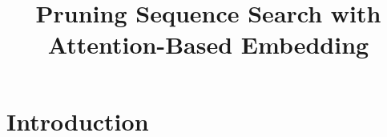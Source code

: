 \documentclass{article}
\title{Pruning Sequence Search with Attention-Based Embedding}
\begin{document}
\maketitle

\begin{abstract}
\end{abstract}

\begin{keywords}
\end{keywords}

\section{Introduction}
\label{sec:intro}

\cite{rakthanmanon2012searching}



\end{document}
